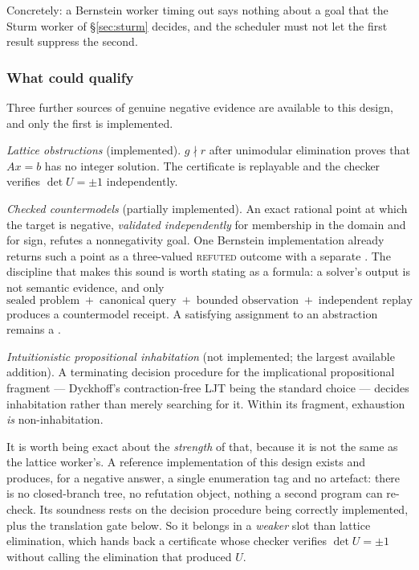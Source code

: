 Concretely: a Bernstein worker timing out says nothing about a goal that the
Sturm worker of \S\ref{sec:sturm} decides, and the scheduler must not let the
first result suppress the second.

\subsubsection*{What could qualify}

Three further sources of genuine negative evidence are available to this
design, and only the first is implemented.

\emph{Lattice obstructions} (implemented). $g \nmid r$ after unimodular
elimination proves that $Ax=b$ has no integer solution. The certificate is
replayable and the checker verifies $\det U=\pm1$ independently.

\emph{Checked countermodels} (partially implemented). An exact rational point
at which the target is negative, \emph{validated independently} for membership
in the domain and for sign, refutes a nonnegativity goal. One Bernstein
implementation already returns such a point as a three-valued
\textsc{refuted} outcome with a separate . The discipline
that makes this sound is worth stating as a formula: a solver's output is not
semantic evidence, and only
\[
\text{sealed problem} \;+\; \text{canonical query} \;+\;
\text{bounded observation} \;+\; \text{independent replay}
\]
produces a countermodel receipt. A satisfying assignment to an abstraction
remains a .

\emph{Intuitionistic propositional inhabitation} (not implemented; the largest
available addition). A terminating decision procedure for the implicational
propositional fragment --- Dyckhoff's contraction-free \textsf{LJT} being the
standard choice --- decides inhabitation rather than merely searching for it.
Within its fragment, exhaustion \emph{is} non-inhabitation.

It is worth being exact about the \emph{strength} of that, because it is not
the same as the lattice worker's. A reference implementation of this design
exists and produces, for a negative answer, a single enumeration tag and no
artefact: there is no closed-branch tree, no refutation object, nothing a
second program can re-check. Its soundness rests on the decision procedure
being correctly implemented, plus the translation gate below. So it belongs in
a \emph{weaker} slot than lattice elimination, which hands back a certificate
whose checker verifies $\det U=\pm1$ without calling the elimination that
produced $U$.

